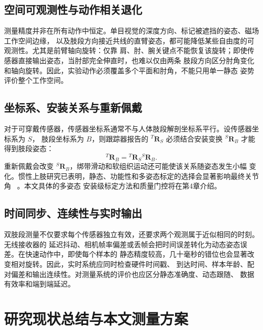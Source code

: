 \subsection{空间可观测性与动作相关退化}
\label{subsec:ch2_observability}

测量精度并非在所有动作中恒定。单目视觉的深度方向、标记被遮挡的姿态、磁场工作空间边缘，
以及肢段方向接近共线的直臂姿态，都可能降低某些自由度的可观测性。尤其是前臂轴向旋转：仅靠
肩、肘、腕关键点不能恢复该旋转；即使传感器直接输出姿态，当肘部完全伸直时，也难以仅由两条
肢段方向区分肘角变化和轴向旋转。因此，实验动作必须覆盖多个平面和肘角，不能只用单一静态
姿势评价整个工作空间。

\subsection{坐标系、安装关系与重新佩戴}
\label{subsec:ch2_mounting_issue}

对于可穿戴传感器，传感器坐标系通常不与人体肢段解剖坐标系平行。设传感器坐标系为 $S$，
肢段坐标系为 $B$，则跟踪器报告的 ${}^{T}\boldsymbol R_S$ 必须结合安装变换
${}^{S}\boldsymbol R_B$ 才能得到肢段姿态：
\begin{equation}
  {}^{T}\boldsymbol R_B={}^{T}\boldsymbol R_S{}^{S}\boldsymbol R_B.
  \label{eq:ch2_sensor_segment_relation}
\end{equation}
重新佩戴会改变 ${}^{S}\boldsymbol R_B$，绑带滑动和软组织运动还可能使该关系随姿态发生小幅
变化。惯性上肢研究已表明，静态、功能性和多姿态标定的选择会显著影响最终关节角
~\cite{seel2014imu,picerno2019upper,zabat2019multiple,adjel2025influence}。本文具体的多姿态
安装级标定方法和质量门控将在第4章介绍。

\subsection{时间同步、连续性与实时输出}
\label{subsec:ch2_temporal_issue}

双肢段测量不仅要求每个传感器独立有效，还要求两个观测属于近似相同的时刻。无线接收器的
延迟抖动、相机帧率偏差或丢帧会把时间误差转化为动态姿态误差。在快速动作中，即使每个样本的
静态精度较高，几十毫秒的错位也会显著改变相对旋转。因此，实时系统应同时检查硬件时间戳、
到达时间、样本年龄、配对偏差和输出连续性。对测量系统的评价也应区分静态准确度、动态跟随、
数据有效率和端到端延迟。

\section{研究现状总结与本文测量方案}
\label{sec:ch2_gap_positioning}

